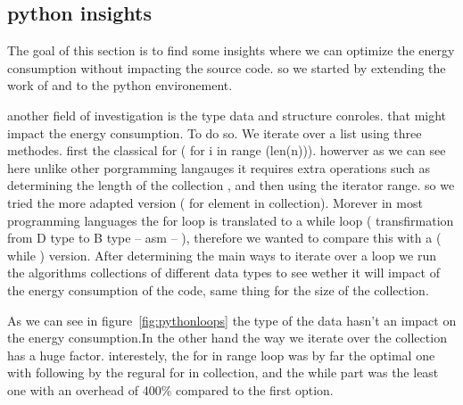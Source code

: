 

\subsection{python insights}

The goal of this section is to find some insights where we can optimize the energy consumption without impacting the source code. so we started by extending the work of \citeauthor{hasan_energy_2016} and \citeauthor{oliveira_recommending_nodate} to the python environement.






another field of investigation is the type data and structure conroles. that might impact the energy consumption.
To do so. We iterate over a list using three methodes.
first the classical for ( for i in range (len(n))). howerver as we can see here unlike other porgramming langauges it requires extra operations such as determining the length of the collection , and then using the iterator range. so we tried the more adapted version
( for element in collection). Morever in most programming languages the for loop is translated to a while loop ( transfirmation from D type to B type -- asm -- ), therefore we wanted to compare this with a ( while ) version.
After determining the main ways to iterate over a loop we run the algorithms  collections of different data types to see wether it will impact of the energy consumption of the code, same thing for the size of the collection.

As we can see in figure~\ref{fig:pythonloops} the type of the data hasn't an impact on the energy consumption.In the other hand the way we iterate over the collection has a huge factor. interestely, the for in range loop was by far the optimal one with following by the regural for in collection, and the while part was the least one with an overhead of 400\% compared to the first option.



